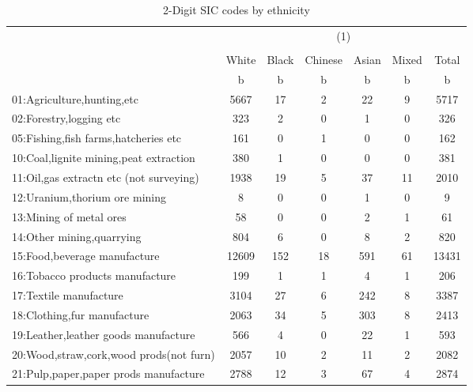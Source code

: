 {
\def\sym#1{\ifmmode^{#1}\else\(^{#1}\)\fi}
\begin{longtable}{l*{6}{c}}
\caption{2-Digit SIC codes by ethnicity}\\
\hline\hline\endfirsthead\hline\endhead\hline\endfoot\endlastfoot
          &\multicolumn{6}{c}{(1)}                                    \\
          &\multicolumn{6}{c}{}                                       \\
          &    White&    Black&  Chinese&    Asian&    Mixed&    Total\\
          &        b&        b&        b&        b&        b&        b\\
\hline
01:Agriculture,hunting,etc&     5667&       17&        2&       22&        9&     5717\\
02:Forestry,logging etc&      323&        2&        0&        1&        0&      326\\
05:Fishing,fish farms,hatcheries etc&      161&        0&        1&        0&        0&      162\\
10:Coal,lignite mining,peat extraction&      380&        1&        0&        0&        0&      381\\
11:Oil,gas extractn etc (not surveying)&     1938&       19&        5&       37&       11&     2010\\
12:Uranium,thorium ore mining&        8&        0&        0&        1&        0&        9\\
13:Mining of metal ores&       58&        0&        0&        2&        1&       61\\
14:Other mining,quarrying&      804&        6&        0&        8&        2&      820\\
15:Food,beverage manufacture&    12609&      152&       18&      591&       61&    13431\\
16:Tobacco products manufacture&      199&        1&        1&        4&        1&      206\\
17:Textile manufacture&     3104&       27&        6&      242&        8&     3387\\
18:Clothing,fur manufacture&     2063&       34&        5&      303&        8&     2413\\
19:Leather,leather goods manufacture&      566&        4&        0&       22&        1&      593\\
20:Wood,straw,cork,wood prods(not furn)&     2057&       10&        2&       11&        2&     2082\\
21:Pulp,paper,paper prods manufacture&     2788&       12&        3&       67&        4&     2874\\

\end{longtable}}
